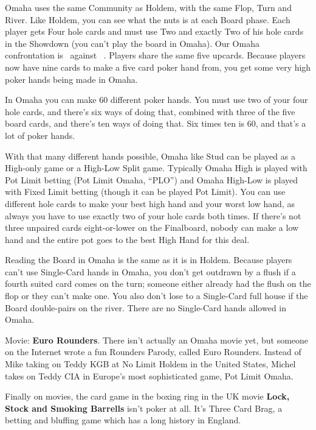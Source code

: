 Omaha uses the same Community as
Holdem, with the same Flop, Turn and River. Like Holdem, you can see
what the nuts is at each Board phase. Each player gets Four hole
cards and must use Two and exactly Two of his hole cards in the
Showdown (you can't play the board in Omaha). Our Omaha confrontation
is 
\back\back\back\back\nines\Qd\Jd\tres\fourd\ against
\back\back\back\back\nines\Qd\Jd\tres\fourd\ . Players share the same five
upcards. Because players now have nine cards to make a five card poker
hand from, you get some very high poker hands being made in Omaha.

In Omaha you can make 60 different poker hands. You must use two of
your four hole cards, and there's six ways of doing that, combined
with three of the five board cards, and there's ten ways of doing
that. Six times ten is 60, and that's a lot of poker hands.

With that many different hands possible, Omaha like Stud can be played
as a High-only game or a High-Low Split game. Typically Omaha High is
played with Pot Limit betting (Pot Limit Omaha, ``PLO'') and Omaha
High-Low is played with Fixed Limit betting (though it can be played
Pot Limit). You can use different hole cards to make your best high
hand and your worst low hand, as always you have to use exactly two of
your hole cards both times. If there's not three unpaired cards
eight-or-lower on the Finalboard, nobody can make a low hand and the
entire pot goes to the best High Hand for this deal.

Reading the Board in Omaha is the same as it is in Holdem. Because
players can't use Single-Card hands in Omaha, you don't get outdrawn
by a flush if a fourth suited card comes on the turn; someone either
already had the flush on the flop or they can't make one. You also
don't lose to a Single-Card full house if the Board double-pairs on
the river. There are no Single-Card hands allowed in Omaha.

Movie: \textbf{Euro Rounders}. There isn't actually an Omaha movie
yet, but someone on the Internet wrote a fun Rounders Parody, called
Euro Rounders. Instead of Mike taking on Teddy KGB at No Limit Holdem
in the United States, Michel takes on Teddy CIA in Europe's most
sophisticated game, Pot Limit Omaha.

Finally on movies, the card game in the boxing ring in the UK movie
\textbf{Lock, Stock and Smoking Barrells} isn't poker at all. It's
Three Card Brag, a betting and bluffing game which has a long history
in England.

